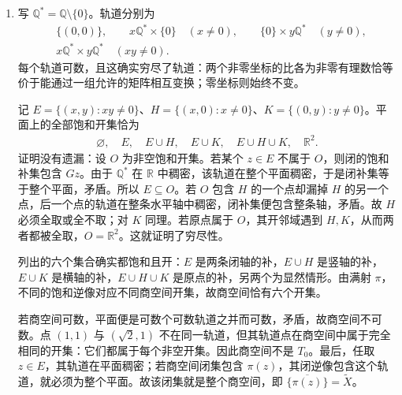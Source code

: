 \documentclass[../../main.tex]{subfiles}%
\begin{document}
\begin{solution}
\begin{enumerate}
必要性来自逆像在任一轴上点附近的矩形，以及原点附近必须同时含两侧轴上点。充分性也逐点由矩形验证：在非零高度用 $V$ 开，在半轴点取不跨越原点的水平小区间，在原点则用两半轴均已包括这一条件。

两个不同非零高度由不遇零的高度区间区分；非零高度与三个特殊点也可如此区分。$p_+,p_-$ 分别可用 $V=\mathbb R\setminus\{0\}$、$D=\{p_+\}$ 或 $D=\{p_-\}$ 的开集区分；同样的开集能区分 $p_+$ 与 $o$，以及 $p_-$ 与 $o$。故商空间 $T_0$。正半轴与负半轴在平面中都不闭，所以商空间不是 $T_1$；更具体地，$\overline{\{p_+\}}=\{p_+,o\}$，$\overline{\{p_-\}}=\{p_-,o\}$。

\item 写 $\mathbb Q^*=\mathbb Q\setminus\{0\}$。轨道分别为
\begin{align*}
&\{(0,0)\},\qquad x\mathbb Q^*\times\{0\}\quad(x\ne0),\qquad
\{0\}\times y\mathbb Q^*\quad(y\ne0),\\
&x\mathbb Q^*\times y\mathbb Q^*\quad(xy\ne0).
\end{align*}
每个轨道可数，且这确实穷尽了轨道：两个非零坐标的比各为非零有理数恰等价于能通过一组允许的矩阵相互变换；零坐标则始终不变。

记 $E=\{(x,y):xy\ne0\}$、$H=\{(x,0):x\ne0\}$、$K=\{(0,y):y\ne0\}$。平面上的全部饱和开集恰为
\begin{align*}
\varnothing,\quad E,\quad E\cup H,\quad E\cup K,\quad
E\cup H\cup K,\quad\mathbb R^2.
\end{align*}
证明没有遗漏：设 $O$ 为非空饱和开集。若某个 $z\in E$ 不属于 $O$，则闭的饱和补集包含 $Gz$。由于 $\mathbb Q^*$ 在 $\mathbb R$ 中稠密，该轨道在整个平面稠密，于是闭补集等于整个平面，矛盾。所以 $E\subseteq O$。若 $O$ 包含 $H$ 的一个点却漏掉 $H$ 的另一个点，后一个点的轨道在整条水平轴中稠密，闭补集便包含整条轴，矛盾。故 $H$ 必须全取或全不取；对 $K$ 同理。若原点属于 $O$，其开邻域遇到 $H,K$，从而两者都被全取，$O=\mathbb R^2$。这就证明了穷尽性。

列出的六个集合确实都饱和且开：$E$ 是两条闭轴的补，$E\cup H$ 是竖轴的补，$E\cup K$ 是横轴的补，$E\cup H\cup K$ 是原点的补，另两个为显然情形。由满射 $\pi$，不同的饱和逆像对应不同商空间开集，故商空间恰有六个开集。

若商空间可数，平面便是可数个可数轨道之并而可数，矛盾，故商空间不可数。点 $(1,1)$ 与 $(\sqrt2,1)$ 不在同一轨道，但其轨道点在商空间中属于完全相同的开集：它们都属于每个非空开集。因此商空间不是 $T_0$。最后，任取 $z\in E$，其轨道在平面稠密；若商空间闭集包含 $\pi(z)$，其闭逆像包含这个轨道，就必须为整个平面。故该闭集就是整个商空间，即 $\overline{\{\pi(z)\}}=\widetilde X$。
\end{enumerate}
\end{solution}
\end{document}

